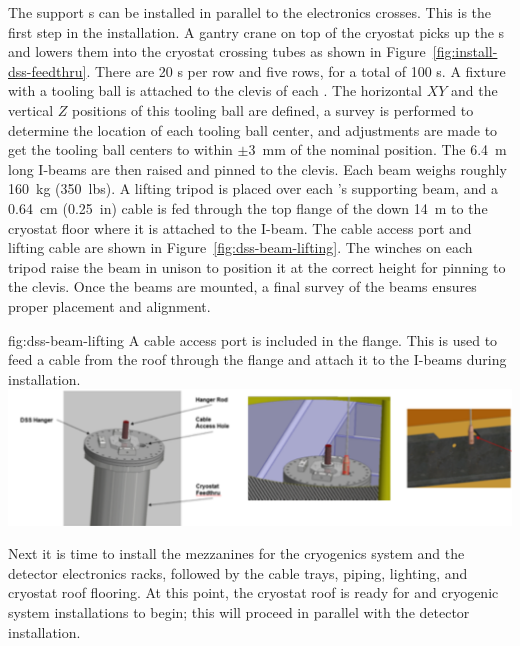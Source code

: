 The  support \fdth{}s can be installed in parallel to the  electronics crosses. This is the first step in the  installation. 
A gantry crane on top of the cryostat picks up the \fdth{}s  and lowers them into the cryostat crossing tubes as shown in Figure~\ref{fig:install-dss-feedthru}. 
There are \num{20} \fdth{}s per row and five rows, for a total of \num{100} \fdth{}s.  A fixture with a tooling ball is attached to the clevis of each \fdth{}.  
The horizontal $XY$ and the vertical $Z$ positions of this tooling ball are defined, a survey is performed to determine the location of each tooling ball center, and adjustments are made to get the tooling ball centers to within $\pm$\SI{3}{mm} of the nominal position.  
The \SI{6.4}{m} long I-beams are then raised and pinned to the clevis.  
Each beam weighs roughly \SI{160}{kg} (\SI{350}{lbs}). 
A lifting tripod is placed over each  \fdth{}'s supporting beam, and a \SI{0.64}{cm} (\SI{0.25}{in})  cable is fed through the top flange of the \fdth down \SI{14}{m} to the cryostat floor where it is attached to the I-beam. 
The cable access port and lifting cable are shown in Figure~\ref{fig:dss-beam-lifting}. 
The winches on each tripod raise the beam in unison to position it at the correct height for pinning to the \fdth clevis.  Once the beams are mounted, a final survey of the beams ensures proper placement and alignment. 
 \begin{dunefigure}{fig:dss-beam-lifting}
  {A cable access port is included in the  flange. This is used to feed a cable from the roof through the flange and attach it to the I-beams during  installation.}
 \includegraphics[width=.95\textwidth]{graphics/dss-beam-lifting.pdf}
\end{dunefigure}


Next it is time to install the mezzanines for the cryogenics system and the detector electronics racks, followed by the cable trays,  piping, lighting, and cryostat roof flooring. At this point, the cryostat roof is ready for  and cryogenic system installations to begin; this will proceed in parallel with the detector installation.





